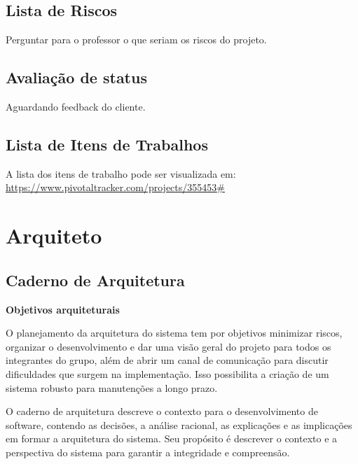 \documentclass[12pt,letterpaper]{article}
\begin{document}
\pagebreak

\subsection{Lista de Riscos}

Perguntar para o professor o que seriam os riscos do projeto.

\pagebreak

\subsection{Avaliação de status}

Aguardando feedback do cliente.

\pagebreak

\subsection{Lista de Itens de Trabalhos}

A lista dos itens de trabalho pode ser visualizada em: \url{https://www.pivotaltracker.com/projects/355453#}

\pagebreak



\section{Arquiteto}

\subsection{Caderno de Arquitetura}

\vspace{1cm}
{\large {\bf Objetivos arquiteturais}}
\vspace{0.5cm}

O planejamento da arquitetura do sistema tem por objetivos minimizar riscos, organizar o desenvolvimento e
dar uma visão geral do projeto para todos os integrantes do grupo, além de abrir um canal de comunicação para discutir dificuldades que surgem na implementação. Isso possibilita a criação de um sistema robusto para manutenções a longo prazo.

O caderno de arquitetura descreve o contexto para o desenvolvimento de software, 
contendo as decisões, a análise racional, as explicações e as implicações em formar a 
arquitetura do sistema. Seu propósito é descrever o contexto e a perspectiva do sistema para 
garantir a integridade e compreensão.
\end{document}

